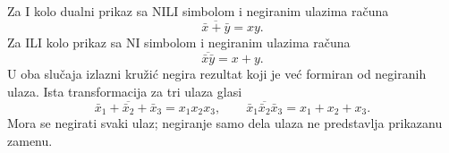 
Za I kolo dualni prikaz sa NILI simbolom i negiranim ulazima računa
\[
\overline{\bar{x}+\bar{y}}=xy.
\]
Za ILI kolo prikaz sa NI simbolom i negiranim ulazima računa
\[
\overline{\bar{x}\bar{y}}=x+y.
\]
U oba slučaja izlazni kružić negira rezultat koji je već formiran od negiranih ulaza. Ista transformacija za tri ulaza glasi
\[
\overline{\bar{x}_1+\bar{x}_2+\bar{x}_3}=x_1x_2x_3,
\qquad
\overline{\bar{x}_1\bar{x}_2\bar{x}_3}=x_1+x_2+x_3.
\]
Mora se negirati svaki ulaz; negiranje samo dela ulaza ne predstavlja prikazanu zamenu.
